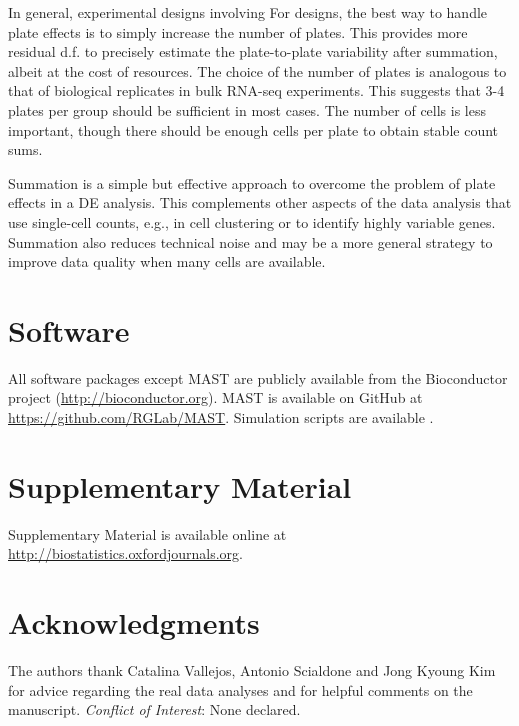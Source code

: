 \documentclass[oupdraft]{bio}
\begin{document}
In general, experimental designs involving 
For  designs, the best way to handle plate effects is to simply increase the number of plates.
This provides more residual d.f. to precisely estimate the plate-to-plate variability after summation, albeit at the cost of  resources.
The choice of the number of plates is analogous to that of biological replicates in bulk RNA-seq experiments.
This suggests that 3-4 plates per group should be sufficient in most cases.
The number of cells is less important, though there should be enough cells per plate to obtain stable count sums.

Summation is a simple but effective approach to overcome the problem of plate effects in a DE analysis. 
This complements other aspects of the data analysis that use single-cell counts, e.g., in cell clustering or to identify highly variable genes.
Summation also reduces technical noise and may be a more general strategy to improve data quality when many cells are available.

\section{Software}
All software packages except MAST are publicly available from the Bioconductor project (\url{http://bioconductor.org}).
MAST is available on GitHub at \url{https://github.com/RGLab/MAST}.
Simulation scripts are available .

\section{Supplementary Material}
Supplementary Material is available online at \href{http://biostatistics.oxfordjournals.org}{http://biostatistics.oxfordjournals.org}.

\section*{Acknowledgments}
The authors thank Catalina Vallejos, Antonio Scialdone and Jong Kyoung Kim for advice regarding the real data analyses and for helpful comments on the manuscript.
{\it Conflict of Interest}: None declared.
\end{document}
